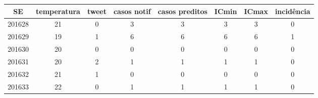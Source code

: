 \begin{tabular}{c|ccccccc}
  \hline
SE & temperatura & tweet & casos notif & casos preditos & ICmin & ICmax & incidência \\ 
  \hline
201628 & 21 & 0 & 3 & 3 & 3 & 3 & 0 \\ 
  201629 & 19 & 1 & 6 & 6 & 6 & 6 & 1 \\ 
  201630 & 20 & 0 & 0 & 0 & 0 & 0 & 0 \\ 
  201631 & 20 & 2 & 1 & 1 & 1 & 1 & 0 \\ 
  201632 & 21 & 1 & 0 & 0 & 0 & 0 & 0 \\ 
  201633 & 22 & 0 & 1 & 1 & 1 & 1 & 0 \\ 
   \hline
\end{tabular}
